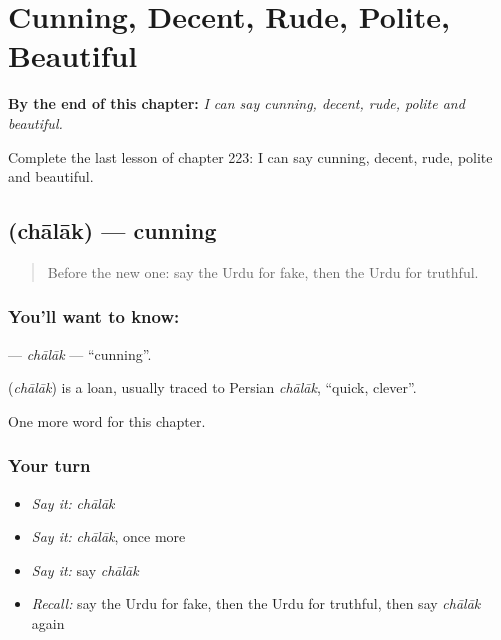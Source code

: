 
\chapter{Cunning, Decent, Rude, Polite, Beautiful}
\label{ch:ur-cunning-decent-rude-polite-beautiful}

\begin{chapteropening}
\textbf{By the end of this chapter:} \emph{I can say cunning, decent, rude, polite and beautiful.}

Complete the last lesson of chapter 223: I can say cunning, decent, rude, polite and beautiful.
\end{chapteropening}

\section[\texorpdfstring{\ur{چالاک} (chālāk)}{چالاک (chālāk)}]{ (chālāk) — cunning}

\label{lesson:UR-C223-chalak}



\begin{quote}
Before the new one: say the Urdu for fake, then the Urdu for truthful.
\end{quote}

\subsection*{You'll want to know: }
\textbf{} — \emph{chālāk} — \textquotedblleft{}cunning\textquotedblright{}.

\begin{cousinweb}
\textbf{} (\emph{chālāk}) is a loan, usually traced to Persian \emph{chālāk}, \textquotedblleft{}quick, clever\textquotedblright{}.
\end{cousinweb}

\begin{grammarlens}[title={What you've built}]
One more word for this chapter.
\end{grammarlens}

\subsection*{Your turn}
\begin{itemize}
\raggedright
  \item \emph{Say it:} \emph{chālāk}
  \item \emph{Say it:} \emph{chālāk}, once more
  \item \emph{Say it:} say \emph{chālāk}
  \item \emph{Recall:} say the Urdu for fake, then the Urdu for truthful, then say \emph{chālāk} again
\end{itemize}

